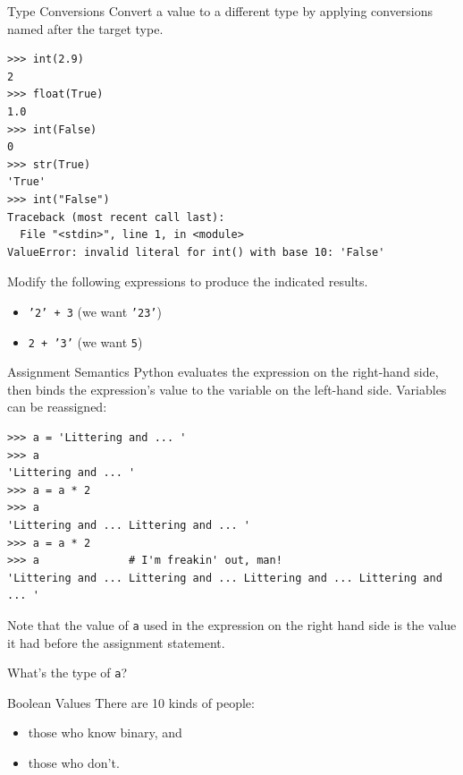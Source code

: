 \documentclass[smaller, aspectratio=1610]{beamer}
\begin{document}
\begin{frame}[label={sec:org9f38750},fragile]{Type Conversions}
 Convert a value to a different type by applying conversions named after the target type.

\lstset{language=Python,label= ,caption= ,captionpos=b,numbers=none}
\begin{lstlisting}
>>> int(2.9)
2
>>> float(True)
1.0
>>> int(False)
0
>>> str(True)
'True'
>>> int("False")
Traceback (most recent call last):
  File "<stdin>", line 1, in <module>
ValueError: invalid literal for int() with base 10: 'False'
\end{lstlisting}

Modify the following expressions to produce the indicated results.

\begin{itemize}
\item \texttt{'2' + 3} (we want \texttt{'23'})
\item \texttt{2 + '3'} (we want \texttt{5})
\end{itemize}
\end{frame}

\begin{frame}[label={sec:orga5be55d},fragile]{Assignment Semantics}
 Python evaluates the expression on the right-hand side, then binds the expression's value to the variable on the left-hand side. Variables can be reassigned:

\lstset{language=Python,label= ,caption= ,captionpos=b,numbers=none}
\begin{lstlisting}
>>> a = 'Littering and ... '
>>> a
'Littering and ... '
>>> a = a * 2
>>> a
'Littering and ... Littering and ... '
>>> a = a * 2
>>> a              # I'm freakin' out, man!
'Littering and ... Littering and ... Littering and ... Littering and ... '
\end{lstlisting}

Note that the value of \texttt{a} used in the expression on the right hand side is the value it had before the assignment statement.

What's the type of \texttt{a}?
\end{frame}

\begin{frame}[label={sec:orga7979b0}]{Boolean Values}
There are 10 kinds of people:

\begin{itemize}
\item those who know binary, and
\item those who don't.
\end{itemize}
\end{frame}
\end{document}
